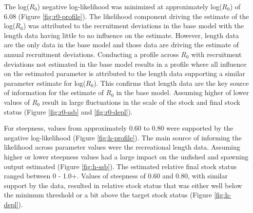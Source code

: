 \documentclass[11pt,
  english,
  a4paper,
]{article}
\begin{document}
The log({\(R_0\)\leavevmode\tagmcend\tagstructend}) negative log-likelihood was minimized at approximately log({\(R_0\)\leavevmode\tagmcend\tagstructend}) of 6.08 (Figure \ref{fig:r0-profile}). The likelihood component driving the estimate of the log({\(R_0\)\leavevmode\tagmcend\tagstructend}) was attributed to the recruitment deviations in the base model with the length data having little to no influence on the estimate. However, length data are the only data in the base model and those data are driving the estimate of annual recruitment deviations. Conducting a profile across {\(R_0\)\leavevmode\tagmcend\tagstructend} with recruitment deviations not estimated in the base model results in a profile where all influence on the estimated parameter is attributed to the length data supporting a similar parameter estimate for log({\(R_0\)\leavevmode\tagmcend\tagstructend}). This confirms that length data are the key source of information for the estimate of {\(R_0\)\leavevmode\tagmcend\tagstructend} in the base model. Assuming higher of lower values of {\(R_0\)\leavevmode\tagmcend\tagstructend} result in large fluctuations in the scale of the stock and final stock status (Figure \ref{fig:r0-ssb} and \ref{fig:r0-depl}).

\leavevmode\tagmcend\tagstructend\par


For steepness, values from approximately 0.60 to 0.80 were supported by the negative log-likelihood (Figure \ref{fig:h-profile}). The main source of informing the likelihood across parameter values were the recreational length data. Assuming higher or lower steepness values had a large impact on the unfished and spawning output estimated (Figure \ref{fig:h-ssb}). The estimated relative final stock status ranged between 0 - 1.0+. Values of steepness of 0.60 and 0.80, with similar support by the data, resulted in relative stock status that was either well below the minimum threshold or a bit above the target stock status (Figure \ref{fig:h-depl}).

\leavevmode\tagmcend\tagstructend\par
\end{document}
